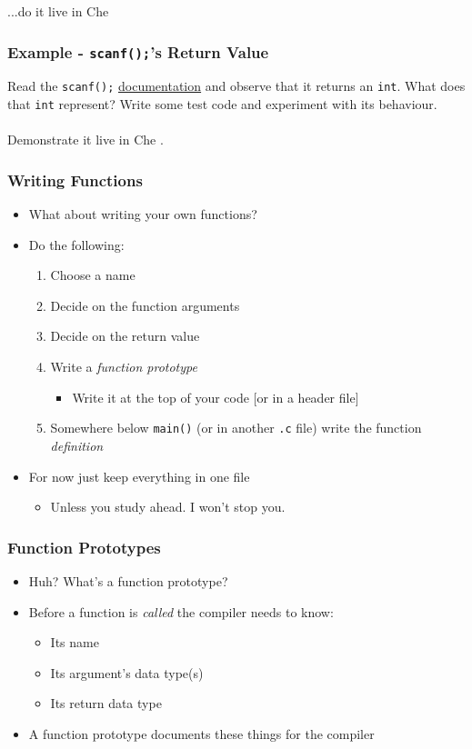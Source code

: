 \documentclass[14pt]{beamer}
\begin{document}
\begin{frame}
\begin{center}
...do it live in Che
\end{center}
\end{frame}

\begin{frame}
\frametitle{Example - \texttt{scanf();}'s Return Value}
Read the \texttt{scanf();} \underline{\href{http://man7.org/linux/man-pages/man3/scanf.3.html}{documentation}} and observe that it returns an \texttt{int}. What does that \texttt{int} represent? Write some test code and experiment with its behaviour.
\\~\\
Demonstrate it live in Che
.\end{frame}

\begin{frame}
\frametitle{Writing Functions}
\begin{itemize}
\item What about writing your own functions?
\pause
\item Do the following:
	\begin{enumerate}
		\item Choose a name
		\pause
		\item Decide on the function arguments
		\pause
		\item Decide on the return value
		\pause
		\item Write a \textit{function prototype}
			\begin{itemize}
				\item Write it at the top of your code [or in a header file]
			\end{itemize}
		\pause
		\item Somewhere below \texttt{main()} (or in another \texttt{.c} file) write the function \textit{definition}
	\end{enumerate}
\pause
\item For now just keep everything in one file
	\begin{itemize}
		\item Unless you study ahead. I won't stop you.
	\end{itemize}
\end{itemize}
\end{frame}

\begin{frame}
\frametitle{Function Prototypes}
\begin{itemize}
\item Huh? What's a function prototype?
\pause
\item Before a function is \textit{called} the compiler needs to know:
	\begin{itemize}
		\item Its name
		\item Its argument's data type(s)
		\item Its return data type 
	\end{itemize}
\pause
\item A function prototype documents these things for the compiler
\end{itemize}
\end{frame}
\end{document}
